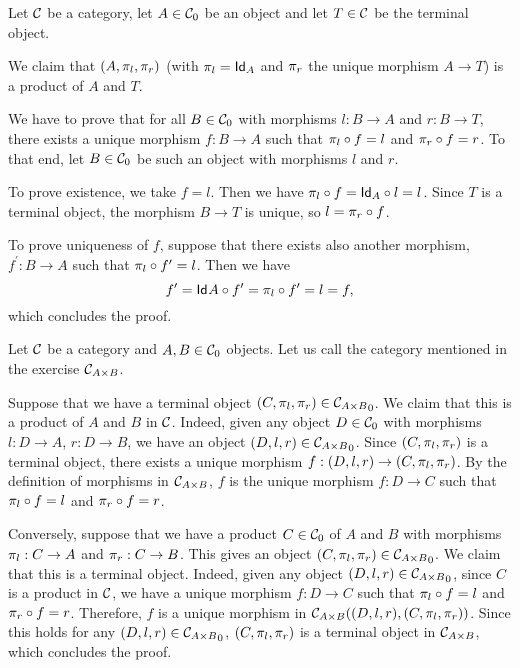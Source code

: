 \begin{solution}\label{sol:product_with_terminal}
	Let $ \CC $ be a category, let $ A \in \Ob\CC $ be an object and let $ T \in \CC $ be the terminal object.

	We claim that $ (A, \projl, \projr) $ (with $ \projl = \Id[A] $ and $ \projr $ the unique morphism $ A \to T $) is a product of $ A $ and $ T $.

	We have to prove that for all $ B \in \Ob\CC $ with morphisms $ l: B \to A $ and $ r: B \to T $, there exists a unique morphism $ f: B \to A $ such that $ \projl \circ f = l $ and $ \projr \circ f = r $. To that end, let $ B \in \Ob\CC $ be such an object with morphisms $ l $ and $ r $.
	
	To prove existence, we take $ f = l $. Then we have $ \projl \circ f = \Id[A] \circ l = l $. Since $ T $ is a terminal object, the morphism $ B \to T $ is unique, so $ l = \projr \circ f $.

	To prove uniqueness of $ f $, suppose that there exists also another morphism, $ f^\prime: B \to A $ such that $ \projl \circ f^\prime = l $. Then we have
	\[ f^\prime = \Id{A} \circ f^\prime = \projl \circ f^\prime = l = f, \]
	which concludes the proof.
\end{solution}

\begin{solution}\label{sol:product_iff_terminal_in_subcategory}
	Let $ \CC $ be a category and $ A, B \in \Ob \CC $ objects. Let us call the category mentioned in the exercise $ \CC_{A \times B} $.

	Suppose that we have a terminal object $ (C, \projl, \projr) \in \Ob{\CC_{A \times B}} $. We claim that this is a product of $ A $ and $ B $ in $ \CC $. Indeed, given any object $ D \in \Ob \CC $ with morphisms $ l: D \to A $, $ r: D \to B $, we have an object $ (D, l, r) \in \Ob{\CC_{A \times B}} $. Since $ (C, \projl, \projr) $ is a terminal object, there exists a unique morphism $ f: (D, l, r) \to (C, \projl, \projr) $. By the definition of morphisms in $ \CC_{A \times B} $, $ f $ is the unique morphism $ f: D \to C $ such that $ \projl \circ f = l $ and $ \projr \circ f = r $.

	Conversely, suppose that we have a product $ C \in \Ob \CC $ of $ A $ and $ B $ with morphisms $ \projl: C \to A $ and $ \projr: C \to B $. This gives an object $ (C, \projl, \projr) \in \Ob{\CC_{A \times B}} $. We claim that this is a terminal object. Indeed, given any object $ (D, l, r) \in \Ob{\CC_{A \times B}} $, since $ C $ is a product in $ \CC $, we have a unique morphism $ f: D \to C $ such that $ \projl \circ f = l $ and $ \projr \circ f = r $. Therefore, $ f $ is a unique morphism in $ \CC_{A \times B}((D, l, r), (C, \projl, \projr)) $. Since this holds for any $ (D, l, r) \in \Ob{\CC_{A \times B}} $, $ (C, \projl, \projr) $ is a terminal object in $ \CC_{A \times B} $, which concludes the proof.
\end{solution}

